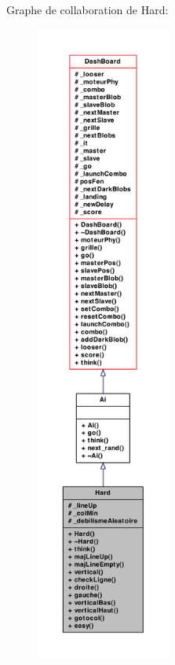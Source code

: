 Graphe de collaboration de Hard:
\nopagebreak
\begin{figure}[H]
\begin{center}
\leavevmode
\includegraphics[height=600pt]{a00087}
\end{center}
\end{figure}
